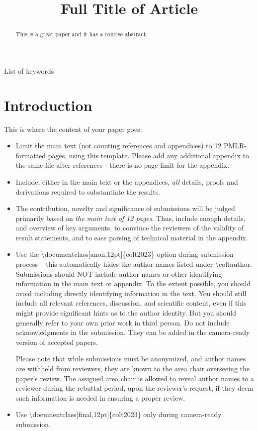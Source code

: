 \documentclass[anon,12pt]{colt2023} %
\title[Short Title]{Full Title of Article}
\begin{document}
\maketitle

\begin{abstract}%
  This is a great paper and it has a concise abstract.%
\end{abstract}

\begin{keywords}%
  List of keywords%
\end{keywords}

\section{Introduction}

This is where the content of your paper goes.
\begin{itemize}
  \item Limit the main text (not counting references and appendices) to 12 PMLR-formatted pages, using this template. Please add any additional appendix to the same file after references - there is no page limit for the appendix.
  \item Include, either in the main text or the appendices, \emph{all} details, proofs and derivations required to substantiate the results.
  \item The contribution, novelty and significance of submissions will be judged primarily based on
\textit{the main text of 12 pages}. Thus, include enough details, and overview of key arguments, 
to convince the reviewers of the validity of result statements, and to ease parsing of technical material in the appendix.
  \item Use the \textbackslash documentclass[anon,12pt]\{colt2023\} option during submission process -- this automatically hides the author names listed under \textbackslash coltauthor. Submissions should NOT include author names or other identifying information in the main text or appendix. To the extent possible, you should avoid including directly identifying information in the text. You should still include all relevant references, discussion, and scientific content, even if this might provide significant hints as to the author identity. But you should generally refer to your own prior work in third person. Do not include acknowledgments in the submission. They can be added in the camera-ready version of accepted papers. 
  
  Please note that while submissions must be anonymized, and author names are withheld from reviewers, they are known to the area chair overseeing the paper’s review.  The assigned area chair is allowed to reveal author names to a reviewer during the rebuttal period, upon the reviewer’s request, if they deem such information is needed in ensuring a proper review.  
  \item Use \textbackslash documentclass[final,12pt]\{colt2023\} only during camera-ready submission.
\end{itemize}
\end{document}
